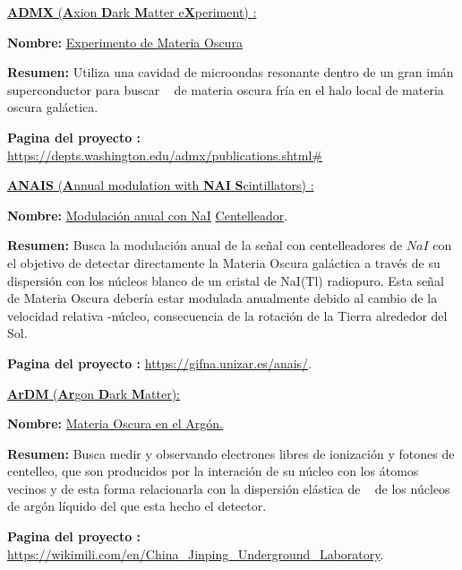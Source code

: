 \begin{itemize_f}
\item[-] \href{https://en.wikipedia.org/wiki/Axion_Dark_Matter_Experiment}{ \textbf{ADMX} (\textbf{A}xion \textbf{D}ark \textbf{M}atter e\textbf{X}periment) :} 
\begin{itemize_f}
\item \textbf{Nombre:} \href{https://en.wikipedia.org/wiki/Axion_Dark_Matter_Experiment}{Experimento de Materia Oscura \Axion}
\item \textbf{Resumen:} Utiliza una cavidad de microondas resonante dentro de un gran imán superconductor para buscar \axiones~ de materia oscura fría en el halo local de materia oscura galáctica. 
\item \textbf{Pagina del proyecto :} \url{https://depts.washington.edu/admx/publications.shtml\#}
\end{itemize_f}




\item[-]\href{https://en.wikipedia.org/wiki/ANAIS}{\textbf{ANAIS} (\textbf{A}nnual modulation with \textbf{NAI} \textbf{S}cintillators) :} 
\begin{itemize_f}
\item \textbf{Nombre:} \href{https://en.wikipedia.org/wiki/ANAIS}{Modulación anual con NaI} \href{https://es.wikipedia.org/wiki/Centelleador}{Centelleador}.
\item \textbf{Resumen:} Busca la modulación anual de la señal con centelleadores de \href{https://es.wikipedia.org/wiki/Yoduro_de_sodio}{$NaI$} con el objetivo de detectar directamente  la Materia Oscura galáctica a través de su dispersión con los núcleos blanco de un cristal de NaI(Tl) radiopuro. Esta señal de Materia Oscura debería estar modulada anualmente debido al cambio de la velocidad relativa \WIMP-núcleo, consecuencia de la rotación de la Tierra alrededor del Sol.
\item \textbf{Pagina del proyecto :} \url{https://gifna.unizar.es/anais/}.
\end{itemize_f}

\item[-] \href{https://en.wikipedia.org/wiki/ArDM}{\textbf{ArDM} (\textbf{Ar}gon \textbf{D}ark \textbf{M}atter): }
\begin{itemize_f}
\item \textbf{Nombre:} \href{https://en.wikipedia.org/wiki/ArDM}{Materia Oscura en el Argón.}
\item \textbf{Resumen:} Busca medir y observando electrones libres de ionización y fotones de centelleo, que son producidos por la interación de su núcleo con los átomos vecinos y de esta forma relacionarla con la dispersión elástica de \WIMP ~ de los núcleos de argón líquido del que esta hecho el detector.
\item \textbf{Pagina del proyecto :} \url{https://wikimili.com/en/China_Jinping_Underground_Laboratory}.
\end{itemize_f}


\end{itemize_f}
